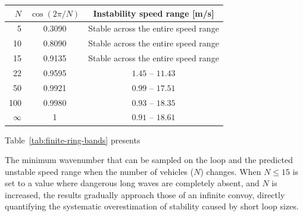 \documentclass[11pt,a4paper,openany]{book}
\numberwithin{equation}{chapter}
\numberwithin{figure}{chapter}
\numberwithin{table}{chapter}
\newcommand{\tabletext}[2]{%
  \par\smallskip\noindent
  Table~\ref{#1} presents #2
\par\smallskip
}
\begin{document}
\begin{center}
\label{tab:finite-ring-bands}
\begin{tabular}{rcc}
\toprule
$N$ & $\cos(2\pi/N)$ &




Instability speed range [m/s]



\\
\midrule
5   & 0.3090 &




Stable across the entire speed range



\\
10  & 0.8090 &




 Stable across the entire speed range



\\
15  & 0.9135 &




Stable across the entire speed range



\\
22  & 0.9595 & $1.45$ -- $11.43$ \\
50  & 0.9921 & $0.99$ -- $17.51$ \\
100 & 0.9980 & $0.93$ -- $18.35$ \\
$\infty$ & 1 & $0.91$ -- $18.61$ \\
\bottomrule
\end{tabular}
\end{center}
\tabletext{tab:finite-ring-bands}{




The minimum wavenumber that can be sampled on the loop and the predicted unstable speed range when the number of vehicles ($N$) changes. When $N\le15$ is set to a value where dangerous long waves are completely absent, and $N$ is increased, the results gradually approach those of an infinite convoy, directly quantifying the systematic overestimation of stability caused by short loop sizes.
}
\end{document}
